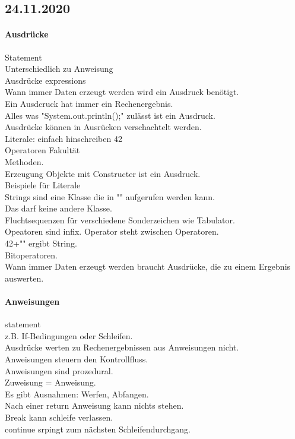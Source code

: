 \documentclass{article}
\begin{document}
	 \subsection*{24.11.2020}
	 \paragraph*{Ausdrücke}
	 Statement \\
	 Unterschiedlich zu Anweisung \\
	 Ausdrücke expressions \\
	 Wann immer Daten erzeugt werden wird ein Ausdruck benötigt. \\
	 Ein Ausdcruck hat immer ein Rechenergebnis. \\
	 Alles was "System.out.println();" zulässt ist ein Ausdruck. \\
	 Ausdrücke können in Ausrücken verschachtelt werden. \\
	 Literale: einfach hinschreiben 42 \\
	 Operatoren Fakultät \\
	 Methoden. \\
	Erzeugung Objekte mit Constructer ist ein Ausdruck. \\
	Beispiele für Literale \\
	Strings sind eine Klasse die in "" aufgerufen werden kann. \\
	Das darf keine andere Klasse. \\
	Fluchtsequenzen für verschiedene Sonderzeichen wie Tabulator. \\
	Opeatoren sind infix. Operator steht zwischen Operatoren. \\
	42+"" ergibt String. \\
	Bitoperatoren. \\
	Wann immer Daten erzeugt werden braucht Ausdrücke, die zu einem Ergebnis auswerten. \\
	
	\paragraph*{Anweisungen}
	statement \\
	z.B. If-Bedingungen oder Schleifen. \\
	Ausdrücke werten zu Rechenergebnissen aus Anweisungen nicht. \\
	Anweisungen steuern den Kontrollfluss. \\
	Anweisungen sind prozedural. \\
	Zuweisung = Anweisung. \\
	Es gibt Ausnahmen: Werfen, Abfangen. \\
	Nach einer return Anweisung kann nichts stehen. \\
	Break kann schleife verlassen. \\
	continue srpingt zum nächsten Schleifendurchgang. \\
	
\end{document}
